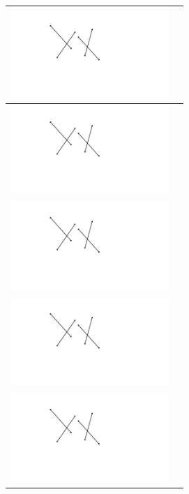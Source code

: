 \documentclass[a4paper,12pt]{article}
\begin{document}
\begin{tabular}[!h]{|p{6cm}|p{10cm}|}
\hline
\includegraphics[width=6cm]{../images/linesweep_no_label.pdf} & \\
\hline
\includegraphics[width=6cm]{../images/linesweep_no_label.pdf} & \\
\hline
\includegraphics[width=6cm]{../images/linesweep_no_label.pdf} & \\
\hline
\includegraphics[width=6cm]{../images/linesweep_no_label.pdf} & \\
\hline
\includegraphics[width=6cm]{../images/linesweep_no_label.pdf} & \\
\hline
\end{tabular}
\end{document}
